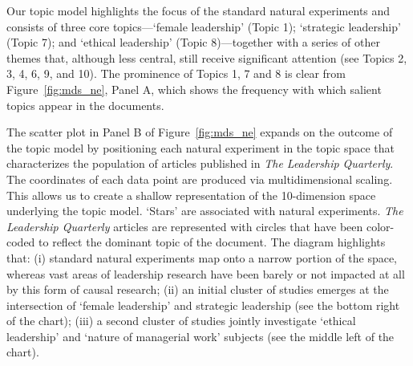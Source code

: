 \documentclass[english]{article}
\begin{document}
Our topic model highlights the focus of the standard natural experiments and
consists of three core topics---`female leadership' (Topic 1); `strategic
leadership' (Topic 7); and `ethical leadership' (Topic 8)---together with a
series of other themes that, although less central, still receive significant
attention (see Topics 2, 3, 4, 6, 9, and 10).  The prominence of Topics 1, 7 and
8 is clear from Figure~\ref{fig:mds_ne}, Panel A, which shows the frequency with
which salient topics appear in the documents.

The scatter plot in Panel B of Figure~\ref{fig:mds_ne} expands on the outcome
of the topic model by positioning each natural experiment in the topic space
that characterizes the population of articles published in \emph{The Leadership
Quarterly}. The coordinates of each data point are produced via multidimensional
scaling. This allows us to create a shallow representation of the 10-dimension
space underlying the topic model.  `Stars' are associated with natural
experiments. \emph{The} \emph{Leadership Quarterly} articles are represented
with circles that have been color-coded to reflect the dominant topic of the
document. The diagram highlights that: (i) standard natural experiments map onto
a narrow portion of the space, whereas vast areas of leadership research have
been barely or not impacted at all by this form of causal research; (ii) an
initial cluster of studies emerges at the intersection of `female leadership'
and strategic leadership (see the bottom right of the chart); (iii) a second
cluster of studies jointly investigate `ethical leadership' and `nature of
managerial work' subjects (see the middle left of the chart).	 
\end{document}

